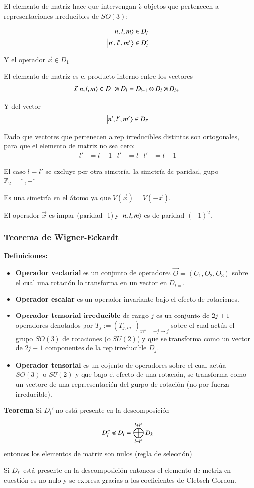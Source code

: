 El elemento de matriz hace que intervengan 3 objetos que pertenecen a representaciones irreducibles de $SO(3)$:

\begin{align*}
    \ket{n,l,m}&\in D_l\\
    \ket{n',l',m'}&\in D_l'\\
\end{align*}

Y el operador $\vec{x}\in D_1$

El elemento de matriz es el producto interno entre los vectores $$\vec{x}\ket{n,l,m}\in D_1\otimes D_l=D_{l-1}\otimes D_{l}\otimes D_{l+1}$$

Y del vector
$$ \ket{n',l',m'}\in D_{l'}$$

Dado que vectores que pertenecen a rep irreducibles distintas son ortogonales, para que el elemento de matriz no sea cero:
\begin{align*}
    l'&=l-1&l'&=l&l'&=l+1
\end{align*}

El caso $l=l'$ se excluye por otra simetría, la simetría de paridad, gupo $\mathbb{Z}_2={\mathbb{1,-1}}$

Es una simetría en el átomo ya que $V(\vec{x})=V(-\vec{x})$.

El operador $\vec{x}$ es impar (paridad -1) y $\ket{n,l,m}$ es de paridad $(-1)^2$.

\subsubsection{Teorema de Wigner-Eckardt}

\textbf{Definiciones:}

\begin{itemize}
    \item \textbf{Operador vectorial} es un conjunto de operadores $\vec{O}=(O_1,O_2,O_3)$ sobre el cual una rotación lo transforma en un vector en $D_{l=1}$
    \item \textbf{Operador escalar} es un operador invariante bajo el efecto de rotaciones.
    \item \textbf{Operador tensorial irreducible} de rango $j$ es un conjunto de $2j+1$ operadores denotados por $T_j:=(T_{j,m''})_{m''=-j\rightarrow j}$ sobre el cual actúa el grupo $SO(3)$ de rotaciones (o $SU(2)$) y que se transforma como un vector de $2j+1$ componentes de la rep irreducible $D_j$.
    \item \textbf{Operador tensorial} es un cojunto de operadores sobre el cual actúa $SO(3)$ o $SU(2)$ y que bajo el efecto de una rotación, se transforma como un vectore de una reprresentación del gurpo de rotación (no por fuerza irreducible).
\end{itemize}

\textbf{Teorema} Si $D_l'$ no está presente en la descomposición 

$$
D_l''\otimes D_l = \bigoplus_{\abs*{l-l''}}^{\abs{l+l''}}D_k
$$
 entonces los elementos de matriz son nulos (regla de selección)

 Si $D_{l'}$ está presente en la descomposición entonces el elemento de metriz en cuestión es no nulo y se expresa gracias a los coeficientes de Clebsch-Gordon.

 